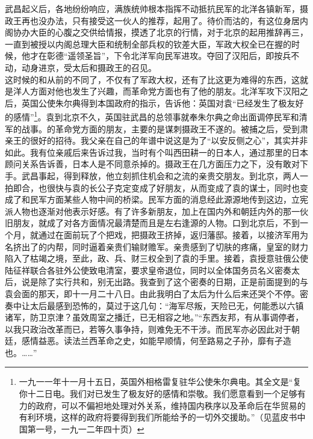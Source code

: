 武昌起义后，各地纷纷响应，满族统帅根本指挥不动抵抗民军的北洋各镇新军，摄政王再也没办法，只有接受这一伙人的推荐，起用了。待价而沽的，有这位身居内阁协办大臣的心腹之交供给情报，摸透了北京的行情，对于北京的起用推辞再三，一直到被授以内阁总理大臣和统制全部兵权的钦差大臣，军政大权全已在握的时候，他才在彰德“遥领圣旨”，下令北洋军向民军进攻。夺回了汉阳后，即按兵不动，动身进京，受太后和摄政王的召见。\\

这时候的和从前的不同了，不仅有了军政大权，还有了比这更为难得的东西，这就是洋人方面对他也发生了兴趣，而革命党方面也有了他的朋友。北洋军攻下汉阳之后，英国公使朱尔典得到本国政府的指示，告诉他：英国对袁“已经发生了极友好的感情”\footnote{一九一一年十一月十五日，英国外相格雷复驻华公使朱尔典电。其全文是“复你十二日电。我们对已发生了极友好的感情和崇敬。我们愿意看到一个足够有力的政府，可以不偏袒地处理对外关系，维持国内秩序以及革命后在华贸易的有利环境，这样的政府将要得到我们所能给予的一切外交援助。”（见蓝皮书中国第一号，一九一二年四十页）}。袁到北京不久，英国驻武昌的总领事就奉朱尔典之命出面调停民军和清军的战事。的革命党方面的朋友，主要的是谋刺摄政王不遂的。被捕之后，受到肃亲王的很好的招待。我父亲在自己的年谱中说这是为了“以安反侧之心”，其实并非如此。我有位亲戚后来告诉过我，当时有个叫西田耕一的日本人，通过那里的日本顾问关系告诉善，日本人是不同意杀掉的。摄政王在几方面压力之下，没有敢对下手。武昌事起，得到释放，他立刻抓住机会和之流的亲贵交朋友。到北京，两人一拍即合，也很快与袁的长公子克定变成了好朋友，从而变成了袁的谋士，同时也变成了和民军方面某些人物中间的桥梁。民军方面的消息经此源源地传到这边，立宪派人物也逐渐对他表示好感。有了许多新朋友，加上在国内外和朝廷内外的那一伙旧朋友，就成了对各方面情况最清楚而且是左右逢源的人物。口到北京后，不到一个月，就通过在面前玩了个把戏，把摄政王挤掉，返归藩邸。接着，以接济军用为名挤出了的内帮，同时逼着亲贵们输财赡军。亲贵感到了切肤的疼痛，皇室的财力陷入了枯竭之境，至此，政、兵、财三权全到了袁的手里。接着，袁授意驻俄公使陆征祥联合各驻外公使致电清室，要求皇帝退位，同时以全体国务员名义密奏太后，说是除了实行共和，别无出路。我查到了这个密奏的日期，正是前面提到的与袁会面的那天，即十一月二十八日。由此我明白了太后为什么后来还哭个不停。密奏中让太后最感到恐怖的，莫过于这几句：“海军尽叛，天险已无，何能悉以六镇诸军，防卫京津？虽效周室之播迁，已无相容之地。”“东西友邦，有从事调停者，以我只政治改革而已，若等久事争持，则难免无不干涉。而民军亦必因此对于朝廷，感情益恶。读法兰西革命之史，如能早顺情，何至路易之子孙，靡有孑造也。……”\\

